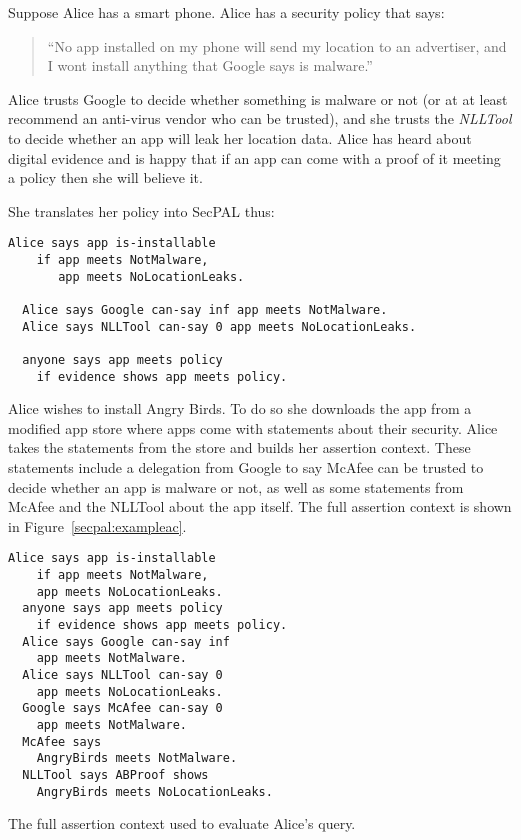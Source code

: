\documentclass[report.tex]{subfiles}
\begin{document}
Suppose Alice has a smart phone.  Alice has a security policy that says:

\begin{quote}
    ``No app installed on my phone will send my location to an advertiser, and I
      wont install anything that Google says is malware.''
\end{quote}

Alice trusts Google to decide whether something is malware or not (or at at
least recommend an anti-virus vendor who can be trusted), and she trusts the
\emph{NLLTool} to decide whether an app will leak her location
data.  Alice has heard about digital evidence and is happy that if an app can
come with a proof of it meeting a policy then she will believe it.

She translates her policy into SecPAL thus:

\begin{lstlisting}[language=SecPAL]
  Alice says app is-installable 
    if app meets NotMalware, 
       app meets NoLocationLeaks.

  Alice says Google can-say inf app meets NotMalware.
  Alice says NLLTool can-say 0 app meets NoLocationLeaks.

  anyone says app meets policy
    if evidence shows app meets policy.
\end{lstlisting}

Alice wishes to install Angry Birds. To do so she downloads the app from a
modified app store where apps come with statements about their security.  Alice
takes the statements from the store and builds her assertion context.  These
statements include a delegation from Google to say McAfee can be trusted to
decide whether an app is malware or not, as well as some statements from McAfee
and the NLLTool about the app itself. The full assertion context is shown in
Figure~\ref{secpal:exampleac}.

\begin{marginfigure}\label{secpal:exampleac}
\begin{lstlisting}[language=SecPAL]
  Alice says app is-installable 
    if app meets NotMalware, 
    app meets NoLocationLeaks.
  anyone says app meets policy 
    if evidence shows app meets policy.
  Alice says Google can-say inf 
    app meets NotMalware.
  Alice says NLLTool can-say 0 
    app meets NoLocationLeaks.
  Google says McAfee can-say 0 
    app meets NotMalware.
  McAfee says 
    AngryBirds meets NotMalware.
  NLLTool says ABProof shows 
    AngryBirds meets NoLocationLeaks.
\end{lstlisting}
\caption{The full assertion context used to evaluate Alice's query.}
\end{marginfigure}
\end{document}
